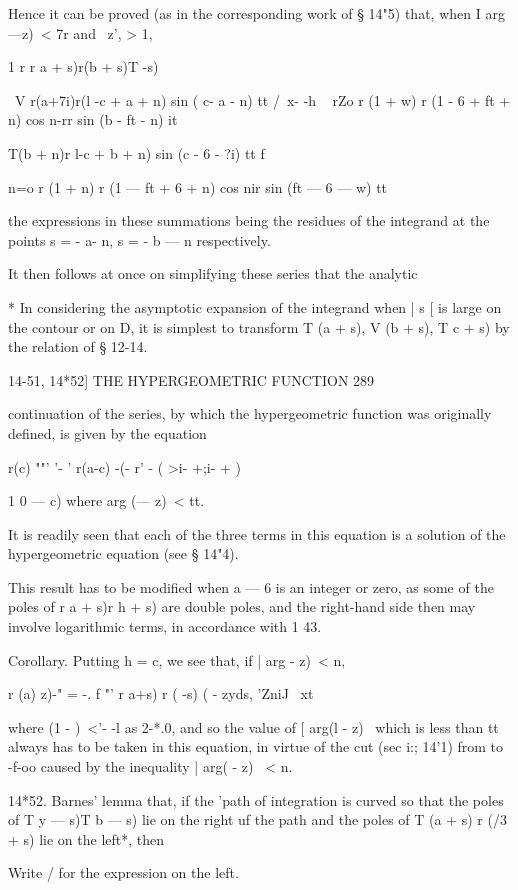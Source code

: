 Hence it can be proved (as in the corresponding work of § 14"5) that,
when I arg —z)\ < 7r and \ z', > 1,

1 r r a + s)r(b + s)T -s)

\ V r(a+7i)r(l -c + a + n) sin ( c- a - n) tt /\ x- -h ~ rZo r (1 + w)
r (1 - 6 + ft + n) cos n-rr sin (b - ft - n) it

  T(b + n)r l-c + b + n) sin (c - 6 - ?i) tt f \

n=o r (1 + n) r (1 — ft + 6 + n) cos nir sin (ft — 6 — w) tt

the expressions in these summations being the residues of the
integrand at the points s = - a- n, s = - b — n respectively.

It then follows at once on simplifying these series that the analytic

* In considering the asymptotic expansion of the integrand when | s [
is large on the contour or on D, it is simplest to transform T (a +
s), V (b + s), T c + s) by the relation of § 12-14.

14-51, 14*52] THE HYPERGEOMETRIC FUNCTION 289

continuation of the series, by which the hypergeometric function was
originally defined, is given by the equation

r(c) ""' '- ' r(a-c) -(- r' - ( >i- +;i- + )

1 0 — c) where arg (— z)\ < tt.

It is readily seen that each of the three terms in this equation is a
solution of the hypergeometric equation (see § 14"4).

This result has to be modified when a — 6 is an integer or zero, as
some of the poles of r a + s)r h + s) are double poles, and the
right-hand side then may involve logarithmic terms, in accordance with
1 43.

Corollary. Putting h = c, we see that, if | arg - z)\ < n,

r (a) z)-" = -. f "' r a+s) r ( -s) ( - zyds, 'ZniJ \ xt

where (1 - )~<'- -l as 2-*.0, and so the value of [ arg(l - z) \ which
is less than tt always has to be taken in this equation, in virtue of
the cut (sec i:; 14'1) from to -f-oo caused by the inequality | arg( -
z) \ < n.

14*52. Barnes' lemma that, if the 'path of integration is curved so
that the poles of T y — s)T b — s) lie on the right uf the path and
the poles of T (a + s) r (/3 + s) lie on the left*, then

Write / for the expression on the left.

